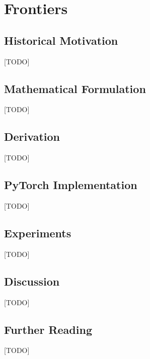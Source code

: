 
\chapter{Frontiers}
\label{ch:19_frontiers}


\section{Historical Motivation}
[TODO]

\section{Mathematical Formulation}
[TODO]

\section{Derivation}
[TODO]

\section{PyTorch Implementation}
[TODO]

\section{Experiments}
[TODO]

\section{Discussion}
[TODO]

\section{Further Reading}
[TODO]
